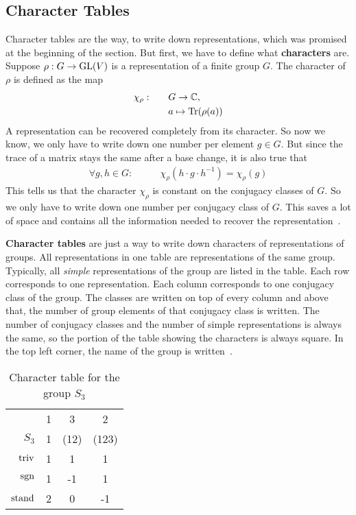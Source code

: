 \subsection{Character Tables}

Character tables are the way, to write down representations, which was promised at the beginning of the section.
But first, we have to define what \textbf{characters} are.
Suppose $\rho: G \to \operatorname{GL}(V)$ is a representation of a finite group $G$.
The character of $\rho$ is defined as the map
\begin{subequations}
    \begin{align}
        \chi_\rho: \qquad & G \to \mathbb{C}, \\
        & a \mapsto \operatorname{Tr}(\rho(a))
    \end{align}
\end{subequations}
A representation can be recovered completely from its character.
So now we know, we only have to write down one number per element $g \in G$.
But since the trace of a matrix stays the same after a base change, it is also true that
\begin{align}
    \forall g, h \in G: \qquad & \chi_\rho(h \cdot g \cdot h^{-1}) = \chi_\rho(g)
\end{align}
This tells us that the character $\chi_\rho$ is constant on the conjugacy classes of $G$.
So we only have to write down one number per conjugacy class of $G$.
This saves a lot of space and contains all the information needed to recover the representation~\cite{fulton2013}.

\textbf{Character tables} are just a way to write down characters of representations of groups.
All representations in one table are representations of the same group.
Typically, all \textit{simple} representations of the group are listed in the table.
Each row corresponds to one representation.
Each column corresponds to one conjugacy class of the group.
The classes are written on top of every column and above that, the number of group elements of that conjugacy class is written.
The number of conjugacy classes and the number of simple representations is always the same, so the portion of the table showing the characters is always square.
In the top left corner, the name of the group is written~\cite{fulton2013}.

\begin{table}
    \centering

    \begin{tabular}{r | c  c  c}
                    & 1 & 3     & 2     \\
        $S_3$       & 1 & (12)  & (123) \\ \hline
        $\operatorname{triv}$     & 1 & 1     & 1     \\
        $\operatorname{sgn}$      & 1 & -1    & 1     \\
        $\operatorname{stand}$    & 2 & 0     & -1
    \end{tabular}

    \caption{Character table for the group $S_3$}
    \label{tab:reprep.char.table}
\end{table}


